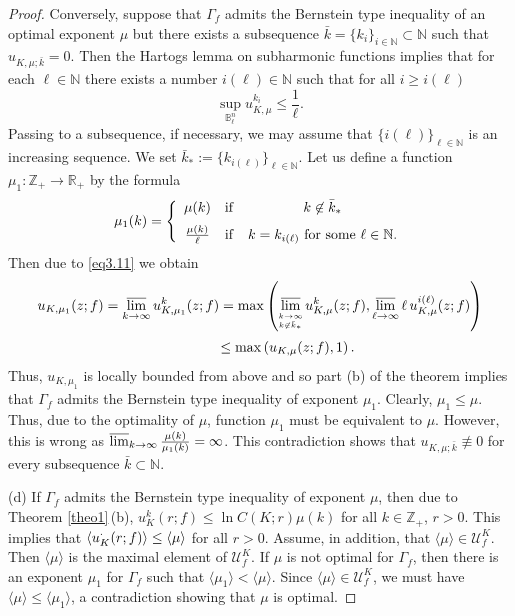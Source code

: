 \documentclass[11pt, oneside]{amsart}
\begin{document}
\begin{proof}
Conversely, suppose that $\Gamma_f$ admits the Bernstein type inequality of an optimal exponent $\mu$ but there exists a subsequence $\bar k=\{k_i\}_{i\in\mathbb N}\subset\mathbb N$ such that $u_{K,\mu;\bar k}= 0$. Then the Hartogs lemma on subharmonic functions implies that for each $\ell\in\mathbb N$ there exists a number $i(\ell)\in\mathbb N$ such that for all $i\ge i(\ell)$
\begin{equation}\label{eq3.11}
\sup_{\mathbb B_\ell^n} u_{K,\mu}^{k_i}\le \frac{1}{\ell}.
\end{equation}
Passing to a subsequence, if necessary, we may assume that $\{i(\ell)\}_{\ell\in\mathbb N}$ is an increasing sequence.
We set $\bar k_*:=\{k_{i(\ell)}\}_{\ell\in\mathbb N}$.
Let us define a function $\mu_1:\mathbb Z_+\rightarrow\mathbb R_+$ by the formula
\[
\mu_1(k)=\left\{
\begin{array}{cccc}
\mu(k)&{\rm if}&k\not\in \bar k_*\medskip\\
\frac{\mu(k)}{\ell}&{\rm if}&k=k_{i(\ell)}\ {\rm for\ some}\ \ell\in\mathbb N.
\end{array}
\right.
\]
Then due to \eqref{eq3.11} we obtain
\[
\begin{array}{r}
\displaystyle
u_{K,\mu_1}(z;f)=\varlimsup_{k\rightarrow\infty}u_{K,\mu_1}^k(z;f)=\max\left(\varlimsup_{\stackrel{ k\rightarrow\infty}{_{k\not\in \bar k_*}}}u_{K,\mu}^k(z;f), \varlimsup_{\ell\rightarrow\infty} \ell\, u_{K,\mu}^{i(\ell)}(z;f) \right)\medskip\\
\displaystyle \le\max\left(u_{K,\mu}(z;f), 1 \right).\qquad\qquad\qquad\qquad\quad\,
\end{array}
\]
Thus, $u_{K,\mu_1}$ is locally bounded from above and so part (b) of the theorem implies that $\Gamma_f$ admits the Bernstein type inequality of exponent $\mu_1$. Clearly, $\mu_1\le\mu$. Thus, due to the optimality of $\mu$, function $\mu_1$ must be equivalent to $\mu$. However, this is wrong as $\varlimsup_{k\rightarrow\infty}\frac{\mu(k)}{\mu_1(k)}=\infty$. This contradiction shows that $u_{K,\mu;\bar k}\not\equiv 0$ for every subsequence $\bar k\subset\mathbb N$.\smallskip 

(d) If $\Gamma_f$ admits the Bernstein type inequality of exponent $\mu$, then due to  Theorem \ref{theo1}\,(b), $u_K^k(r;f)\le\ln C(K;r)\mu(k)$ for all $k\in\mathbb Z_+$, $r>0$. This implies that $\langle u_K^{{\bf\cdot}}(r;f)\rangle\le\langle\mu\rangle$ for all $r>0$. Assume, in addition, that $\langle\mu\rangle\in \mathscr U_f^K$.
Then $\langle\mu\rangle$ is the maximal element of $\mathscr U_f^K$.
If $\mu$ is not optimal for $\Gamma_f$, then there is an exponent $\mu_1$ for $\Gamma_f$ such that $\langle\mu_1\rangle<\langle\mu\rangle$. Since $\langle\mu\rangle\in\mathscr U_f^K$, we must have $\langle\mu\rangle\le\langle\mu_1\rangle$, a contradiction showing that $\mu$ is optimal.


\end{proof}
\end{document}
